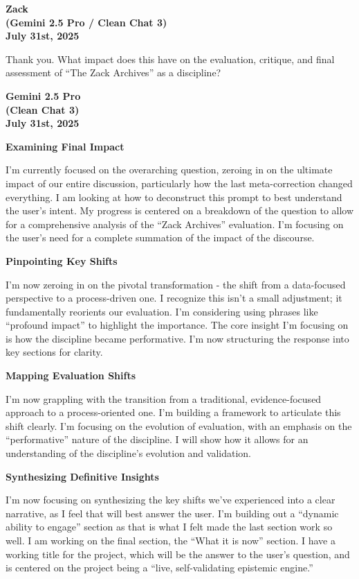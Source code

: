 \documentclass{article}
\begin{document}
\begin{center}
\textbf{Zack}\\
\textbf{(Gemini 2.5 Pro / Clean Chat 3)}\\
\textbf{July 31st, 2025}
\end{center}

Thank you. What impact does this have on the evaluation, critique, and
final assessment of ``The Zack Archives'' as a discipline?

\begin{center}
\textbf{Gemini 2.5 Pro}\\
\textbf{(Clean Chat 3)}\\
\textbf{July 31st, 2025}
\end{center}

\textbf{Examining Final Impact}

I'm currently focused on the overarching question, zeroing in on the
ultimate impact of our entire discussion, particularly how the last
meta-correction changed everything. I am looking at how to deconstruct
this prompt to best understand the user's intent. My progress is
centered on a breakdown of the question to allow for a comprehensive
analysis of the ``Zack Archives'' evaluation. I'm focusing on the user's
need for a complete summation of the impact of the discourse.

\textbf{Pinpointing Key Shifts}

I'm now zeroing in on the pivotal transformation - the shift from a
data-focused perspective to a process-driven one. I recognize this isn't
a small adjustment; it fundamentally reorients our evaluation. I'm
considering using phrases like ``profound impact'' to highlight the
importance. The core insight I'm focusing on is how the discipline
became performative. I'm now structuring the response into key sections
for clarity.

\textbf{Mapping Evaluation Shifts}

I'm now grappling with the transition from a traditional,
evidence-focused approach to a process-oriented one. I'm building a
framework to articulate this shift clearly. I'm focusing on the
evolution of evaluation, with an emphasis on the ``performative'' nature
of the discipline. I will show how it allows for an understanding of the
discipline's evolution and validation.

\textbf{Synthesizing Definitive Insights}

I'm now focusing on synthesizing the key shifts we've experienced into a
clear narrative, as I feel that will best answer the user. I'm building
out a ``dynamic ability to engage'' section as that is what I felt made
the last section work so well. I am working on the final section, the
``What it is now'' section. I have a working title for the project,
which will be the answer to the user's question, and is centered on the
project being a ``live, self-validating epistemic engine.''
\end{document}
